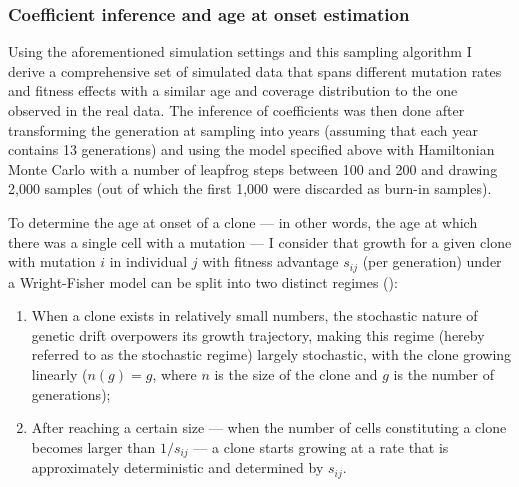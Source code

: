\subsubsection{Coefficient inference and age at onset estimation}

Using the aforementioned simulation settings and this sampling algorithm I derive a comprehensive set of simulated data that spans different mutation rates and fitness effects with a similar age and coverage distribution to the one observed in the real data. The inference of coefficients was then done after transforming the generation at sampling into years (assuming that each year contains 13 generations) and using the model specified above with Hamiltonian Monte Carlo with a number of leapfrog steps between 100 and 200 and drawing 2,000 samples (out of which the first 1,000 were discarded as burn-in samples). 

To determine the age at onset of a clone --- in other words, the age at which there was a single cell with a mutation --- I consider that growth for a given clone with mutation $i$ in individual $j$ with fitness advantage $s_{ij}$ (per generation) under a Wright-Fisher model can be split into two distinct regimes ():

\begin{enumerate}
    \item When a clone exists in relatively small numbers, the stochastic nature of genetic drift overpowers its growth trajectory, making this regime (hereby referred to as the stochastic regime) largely stochastic, with the clone growing linearly ($n(g) = g$, where $n$ is the size of the clone and $g$ is the number of generations);
    \item After reaching a certain size --- when the number of cells constituting a clone becomes larger than $1/s_{ij}$ --- a clone starts growing at a rate that is approximately deterministic and determined by $s_{ij}$.
\end{enumerate}

\begin{figure}[!ht]
	\label{fig:wf-example}
\end{figure}

